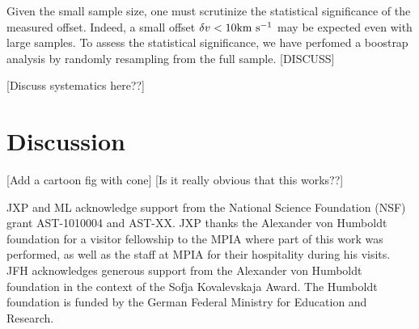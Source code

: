 \documentclass[12pt,preprint]{aastex}
\begin{document}
Given the small sample size, one must 
scrutinize the statistical significance of the measured offset.
Indeed, a small offset $\delta v < 10 {\rm km~s^{-1}}$ may be expected
even with large samples.  To assess the statistical significance,
we have perfomed a boostrap analysis by randomly resampling
from the full sample. [DISCUSS]

[Discuss systematics here??]

\section{Discussion}
\label{sec:discussion}

[Add a cartoon fig with cone]
[Is it really obvious that this works??]


\acknowledgements

JXP and ML acknowledge support from the National
Science Foundation (NSF) grant AST-1010004 and AST-XX. 
JXP thanks the Alexander
von Humboldt foundation for a visitor fellowship to the MPIA where
part of this work was performed, as well as the staff at MPIA for
their hospitality during his visits.
JFH acknowledges generous support from the Alexander von Humboldt
foundation in the context of the Sofja Kovalevskaja Award. The
Humboldt foundation is funded by the German Federal Ministry for
Education and Research.  

%
%
\end{document}

